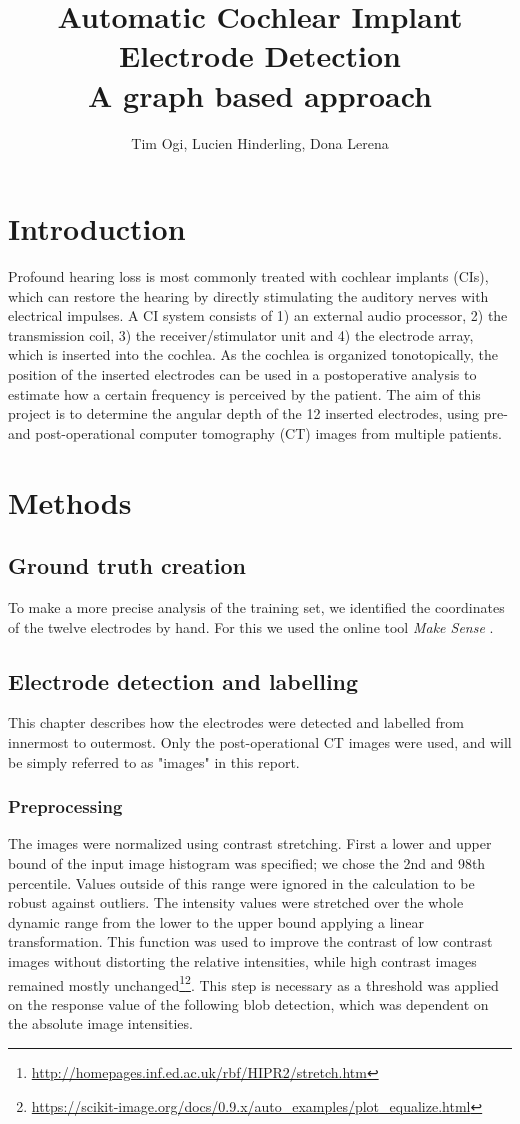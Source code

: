\documentclass[a4paper, 10pt, twocolumn]{article}
\title{\textbf{Automatic Cochlear Implant Electrode Detection}\\ A graph based approach}
\author{Tim Ogi, Lucien Hinderling, Dona Lerena}
\begin{document}
\maketitle
\section{Introduction}
Profound hearing loss is most commonly treated with cochlear implants (CIs), which can restore the hearing by directly stimulating the auditory nerves with electrical impulses. A CI system consists of 1) an external audio processor, 2) the transmission coil, 3) the receiver/stimulator unit and 4) the electrode array, which is inserted into the cochlea. As the cochlea is organized tonotopically, the position of the inserted electrodes can be used in a postoperative analysis to estimate how a certain frequency is perceived by the patient. The aim of this project is to determine the angular depth of the 12 inserted electrodes, using pre- and post-operational computer tomography (CT) images from multiple patients.
\section{Methods}
\subsection{Ground truth creation}
To make a more precise analysis of the training set, we identified the coordinates of the twelve electrodes by hand. For this we used the online tool  \emph{Make Sense} \cite{makesense}. 
\subsection{Electrode detection and labelling}
This chapter describes how the electrodes were detected and labelled from innermost to outermost. Only the post-operational CT images were used, and will be simply referred to as "images" in this report.
\subsubsection{Preprocessing}
The images were normalized using contrast stretching. First a lower and upper bound of the input image histogram was specified; we chose the 2nd and 98th percentile. Values outside of this range were ignored in the calculation to be robust against outliers. The intensity values were stretched over the whole dynamic range from the lower to the upper bound applying a linear transformation. This function was used to improve the contrast of low contrast images without distorting the relative intensities, while high contrast images remained mostly unchanged\footnote{\url{http://homepages.inf.ed.ac.uk/rbf/HIPR2/stretch.htm}}\footnote{\url{https://scikit-image.org/docs/0.9.x/auto_examples/plot_equalize.html}}. This step is necessary as a threshold was applied on the response value of the following blob detection, which was dependent on the absolute image intensities.
\end{document}

